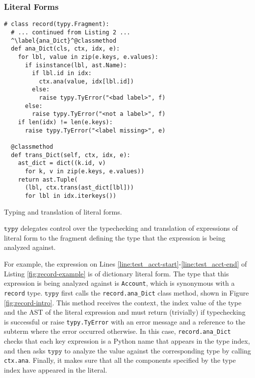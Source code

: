 \documentclass[preprint,10pt]{sigplanconf}
\newcommand{\typy}{\texttt{typy}}
\newcommand{\lip}[1]{\lstinline[language=Python,basicstyle=\ttfamily\footnotesize,deletendkeywords={tuple,buffer,map}]{#1}}
\newcommand{\li}[1]{\lip{#1}}
\begin{document}
\subsubsection{Literal Forms}\label{sec:literals}
\vspace{-3px}
\begin{codelisting}[t]
\vspace{-3px}
\begin{lstlisting}
# class record(typy.Fragment): 
  # ... continued from Listing 2 ...
  ^\label{ana_Dict}^@classmethod
  def ana_Dict(cls, ctx, idx, e):
    for lbl, value in zip(e.keys, e.values):
      if isinstance(lbl, ast.Name):
        if lbl.id in idx: 
          ctx.ana(value, idx[lbl.id])
        else: 
          raise typy.TyError("<bad label>", f)
      else: 
        raise typy.TyError("<not a label>", f)
    if len(idx) != len(e.keys): 
      raise typy.TyError("<label missing>", e)

  @classmethod
  def trans_Dict(self, ctx, idx, e): 
    ast_dict = dict((k.id, v) 
      for k, v in zip(e.keys, e.values))
    return ast.Tuple(
      (lbl, ctx.trans(ast_dict[lbl]))
      for lbl in idx.iterkeys())
\end{lstlisting}
\caption{Typing and translation of literal forms.}
\label{fig:record-intro}
\end{codelisting}
$\typy$ delegates control over the typechecking and translation of expressions of literal form to the fragment defining the type that the expression is being analyzed against. 

For example, the expression on Lines \ref{line:test_acct-start}-\ref{line:test_acct-end} of Listing \ref{fig:record-example} is of dictionary literal form. The type that this expression is being analyzed against is \li{Account}, which is synonymous with a \li{record} type. $\typy$ first calls the \li{record.ana_Dict} class method, shown in Figure \ref{fig:record-intro}. This method receives the context, the index value of the type and the AST of the literal expression and must return (trivially) if typechecking is successful or raise \li{typy.TyError} with an error message and a reference to the subterm where the error occurred otherwise. In this case, \li{record.ana_Dict} checks that each key expression is a Python name that appears in the type index, and then asks $\typy$ to analyze the value against the corresponding type by calling \li{ctx.ana}. Finally, it makes sure that all the components specified by the type index have appeared in the literal.
\end{document}
